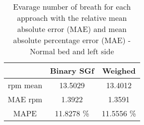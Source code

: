 \begin{table}[H]
    \centering
    \begin{tabular}{|c|c|c|}
    \hline 
    & Binary SGf & Weighed  \\ 
    \hline 
    rpm mean &13.5029 &  13.4012\\
    MAE rpm & 1.3922 &     1.3591 \\ 
    MAPE  & 11.8278 \% & 11.5556 \% \\ 
    \hline 
    \end{tabular}
    
    \caption{Evarage number of breath for each approach with the relative mean
    absolute error (MAE) and mean absolute percentage error (MAE) - Normal bed
    and left side}
    \label{tab:LeftNormalStillMetricssg}    
\end{table}
    
    